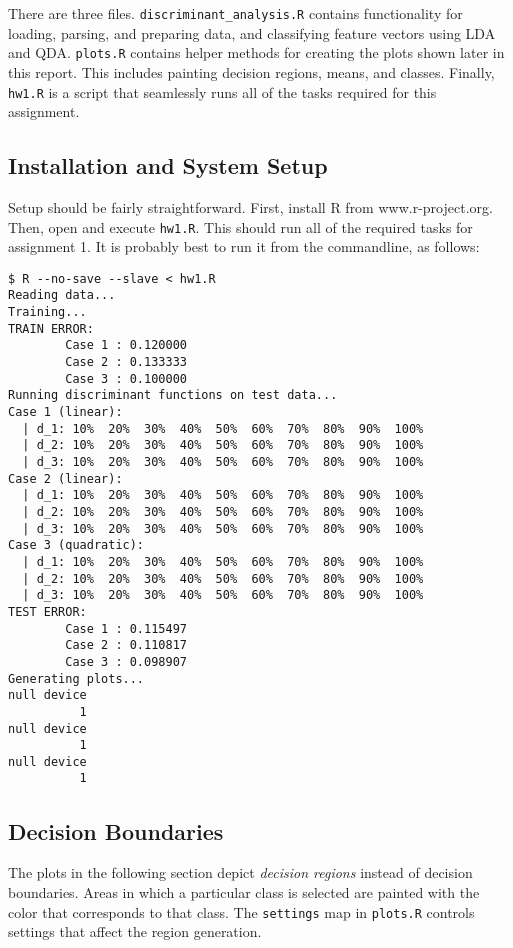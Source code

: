 \documentclass{article}
\begin{document}
There are three files. \verb|discriminant_analysis.R| contains functionality for loading,
parsing, and preparing data, and classifying feature vectors using LDA and QDA.
\verb|plots.R| contains helper methods for creating the plots shown later in this report.
This includes painting decision regions, means, and classes. Finally, \verb|hw1.R| is a
script that seamlessly runs all of the tasks required for this assignment.

\subsection{Installation and System Setup}

Setup should be fairly straightforward. First, install R from www.r-project.org. Then,
open and execute \verb|hw1.R|. This should run all of the required tasks for assignment
1. It is probably best to run it from the commandline, as follows:
\begin{verbatim}
$ R --no-save --slave < hw1.R
Reading data...
Training...
TRAIN ERROR:
        Case 1 : 0.120000
        Case 2 : 0.133333
        Case 3 : 0.100000
Running discriminant functions on test data...
Case 1 (linear):
  | d_1: 10%  20%  30%  40%  50%  60%  70%  80%  90%  100%
  | d_2: 10%  20%  30%  40%  50%  60%  70%  80%  90%  100%
  | d_3: 10%  20%  30%  40%  50%  60%  70%  80%  90%  100%
Case 2 (linear):
  | d_1: 10%  20%  30%  40%  50%  60%  70%  80%  90%  100%
  | d_2: 10%  20%  30%  40%  50%  60%  70%  80%  90%  100%
  | d_3: 10%  20%  30%  40%  50%  60%  70%  80%  90%  100%
Case 3 (quadratic):
  | d_1: 10%  20%  30%  40%  50%  60%  70%  80%  90%  100%
  | d_2: 10%  20%  30%  40%  50%  60%  70%  80%  90%  100%
  | d_3: 10%  20%  30%  40%  50%  60%  70%  80%  90%  100%
TEST ERROR:
        Case 1 : 0.115497
        Case 2 : 0.110817
        Case 3 : 0.098907
Generating plots...
null device
          1
null device
          1
null device
          1
\end{verbatim}

\subsection{Decision Boundaries}

The plots in the following section depict {\it decision regions} instead of
decision boundaries. Areas in which a particular class is selected are 
painted with the color that corresponds to that class. The \verb|settings|
map in \verb|plots.R| controls settings that affect the region generation.
\end{document}
